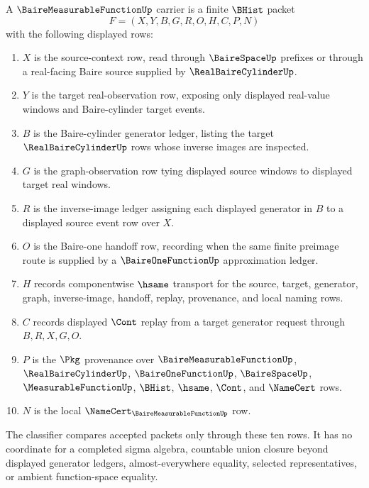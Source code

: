 \begin{definition}
\label{def:baire-measurable-function-carrier}
A $\BaireMeasurableFunctionUp$ carrier is a finite $\BHist$ packet
$$
F=(X,Y,B,G,R,O,H,C,P,N)
$$
with the following displayed rows:
\begin{enumerate}
\item $X$ is the source-context row, read through $\BaireSpaceUp$ prefixes or through a real-facing Baire source supplied by $\RealBaireCylinderUp$.
\item $Y$ is the target real-observation row, exposing only displayed real-value windows and Baire-cylinder target events.
\item $B$ is the Baire-cylinder generator ledger, listing the target $\RealBaireCylinderUp$ rows whose inverse images are inspected.
\item $G$ is the graph-observation row tying displayed source windows to displayed target real windows.
\item $R$ is the inverse-image ledger assigning each displayed generator in $B$ to a displayed source event row over $X$.
\item $O$ is the Baire-one handoff row, recording when the same finite preimage route is supplied by a $\BaireOneFunctionUp$ approximation ledger.
\item $H$ records componentwise $\hsame$ transport for the source, target, generator, graph, inverse-image, handoff, replay, provenance, and local naming rows.
\item $C$ records displayed $\Cont$ replay from a target generator request through $B,R,X,G,O$.
\item $P$ is the $\Pkg$ provenance over $\BaireMeasurableFunctionUp$, $\RealBaireCylinderUp$, $\BaireOneFunctionUp$, $\BaireSpaceUp$, $\MeasurableFunctionUp$, $\BHist$, $\hsame$, $\Cont$, and $\NameCert$ rows.
\item $N$ is the local $\NameCert_{\BaireMeasurableFunctionUp}$ row.
\end{enumerate}
The classifier compares accepted packets only through these ten rows. It has no coordinate for a completed sigma algebra, countable union closure beyond displayed generator ledgers, almost-everywhere equality, selected representatives, or ambient function-space equality.
\end{definition}

